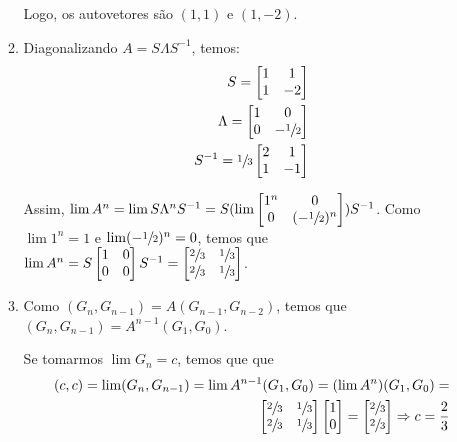\documentclass[leqno]{article}
\newcommand{\ezvecbi}[2]{\begin{bmatrix}
#1\\
#2\\
\end{bmatrix}}
\begin{document}
\begin{enumerate}
\begin{enumerate}
        Logo, os autovetores são $(1,1)$ e $(1,-2)$.
        
        \item Diagonalizando $A=S\Lambda S^{-1}$, temos:
        \begin{align*}
            S = \begin{bmatrix}1 & 1\\
            1 & -2\end{bmatrix}\\
            \Lambda = \begin{bmatrix}1 & 0\\
            0 & -\sfrac{1}{2}\end{bmatrix}\\
            S^{-1}=\sfrac{1}{3}\begin{bmatrix}2 & 1\\
            1 & -1\end{bmatrix}
        \end{align*}
        
        Assim, $\lim A^n=\lim S\Lambda^nS^{-1}=S(\lim \begin{bmatrix}1^n & 0\\
        0 & (-\sfrac{1}{2})^n\end{bmatrix})S^{-1}$. Como $\lim 1^n=1$ e $\lim (-\sfrac{1}{2})^n=0$, temos que $\lim A^n=S\begin{bmatrix}1 & 0\\
        0 & 0\end{bmatrix}S^{-1}=\begin{bmatrix}\sfrac{2}{3} & \sfrac{1}{3}\\
        \sfrac{2}{3} & \sfrac{1}{3}\end{bmatrix}$.
        
        \item Como $(G_n, G_{n-1})=A(G_{n-1}, G_{n-2})$, temos que $(G_n, G_{n-1})=A^{n-1}(G_1, G_0)$.
        
        Se tomarmos $\lim G_n=c$, temos que que 
        \begin{align*}
            (c,c)=\lim (G_n, G_{n-1})=\lim A^{n-1}(G_1, G_0)=(\lim A^n) (G_1, G_0)=\\
            \begin{bmatrix}\sfrac{2}{3} & \sfrac{1}{3}\\
        \sfrac{2}{3} & \sfrac{1}{3}\end{bmatrix}\ezvecbi{1}{0}=\ezvecbi{\sfrac{2}{3}}{\sfrac{2}{3}}\Rightarrow c=\frac{2}{3}
        \end{align*}
        

\end{enumerate}
\end{enumerate}
\end{document}
